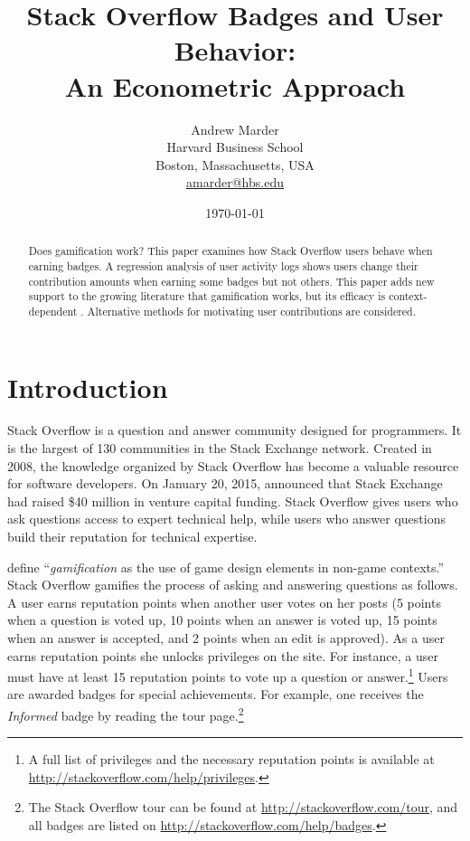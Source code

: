 \documentclass[conference]{IEEEtran}
\title{
  Stack Overflow Badges and User Behavior: \\
  An Econometric Approach
}
\author{
  Andrew Marder \\
  Harvard Business School \\
  Boston, Massachusetts, USA \\
  \href{mailto:amarder@hbs.edu}{amarder@hbs.edu}
}
\date{\today}
\newcommand{\1}{\mathds{1}}
\begin{document}
\maketitle

\begin{abstract}
Does gamification work? This paper examines how Stack Overflow users behave when earning badges. A regression analysis of user activity logs shows users change their contribution amounts when earning some badges but not others. This paper adds new support to the growing literature that gamification works, but its efficacy is context-dependent \citep{Hamari}. Alternative methods for motivating user contributions are considered.
\end{abstract}

\section{Introduction}

Stack Overflow is a question and answer community designed for programmers. It is the largest of 130 communities in the Stack Exchange network. Created in 2008, the knowledge organized by Stack Overflow has become a valuable resource for software developers. On January 20, 2015, \citet{Spoelsky2015} announced that Stack Exchange had raised \$40 million in venture capital funding. Stack Overflow gives users who ask questions access to expert technical help, while users who answer questions build their reputation for technical expertise.

\citet{Deterding2011} define ``\textit{gamification} as the use of game design elements in non-game contexts.'' Stack Overflow gamifies the process of asking and answering questions as follows. A user earns reputation points when another user votes on her posts (5 points when a question is voted up, 10 points when an answer is voted up, 15 points when an answer is accepted, and 2 points when an edit is approved). As a user earns reputation points she unlocks privileges on the site. For instance, a user must have at least 15 reputation points to vote up a question or answer.\footnote{A full list of privileges and the necessary reputation points is available at \url{http://stackoverflow.com/help/privileges}.} Users are awarded badges for special achievements. For example, one receives the \textit{Informed} badge by reading the tour page.\footnote{The Stack Overflow tour can be found at \url{http://stackoverflow.com/tour}, and all badges are listed on \url{http://stackoverflow.com/help/badges}.}
\end{document}
